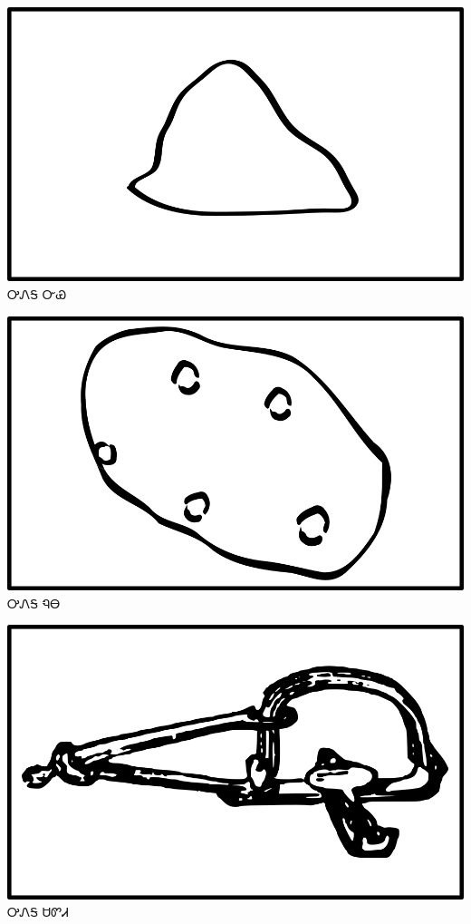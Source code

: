 \documentclass[avery5371]{flashcards}%
\begin{document}
    \begin{flashcard}{
        \includegraphics[width=0.95\columnwidth,height=.51\columnwidth,keepaspectratio]{../artwork/objects-neutral/nvya}
    }
        \Huge ᎤᏁᎦ ᏅᏯ
    \end{flashcard}

    \begin{flashcard}{
        \includegraphics[width=0.95\columnwidth,height=.51\columnwidth,keepaspectratio]{../artwork/objects-neutral/nuna}
    }
        \Huge ᎤᏁᎦ ᏄᎾ
    \end{flashcard}

    \begin{flashcard}{
        \includegraphics[width=0.95\columnwidth,height=.51\columnwidth,keepaspectratio]{../artwork/objects-neutral/sadvdi}
    }
        \Huge ᎤᏁᎦ ᏌᏛᏗ
    \end{flashcard}
\end{document}
